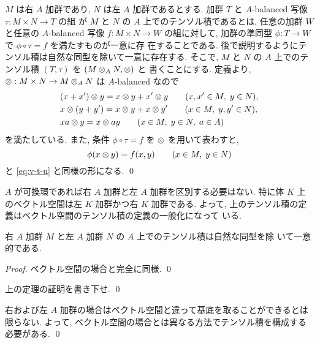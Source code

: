 \documentclass[12pt,twoside]{jarticle}
\begin{document}
\begin{definition}[環上の加群のテンソル積]
  $M$ は右 $A$ 加群であり, $N$ は左 $A$ 加群であるとする.
  加群 $T$ と $A$-balanced 写像 $\tau:M\times N\to T$ の組
  が $M$ と $N$ の $A$ 上でのテンソル積であるとは, 
  任意の加群 $W$ と任意の $A$-balanced 写像 $f:M\times N\to W$ の組に対して, 
  加群の準同型 $\phi: T\to W$ で $\phi\circ\tau = f$ を満たすものが一意に存
  在することである.  
  後で説明するようにテンソル積は自然な同型を除いて一意に存在する.
  そこで, $M$ と $N$ の $A$ 上でのテンソル積 $(T,\tau)$ を $(M\otimes_A N,\otimes)$ と
  書くことにする.  定義より, $\otimes:M\times N\to M\otimes_A N$ は $A$-balanced なので
  \begin{align*}
  &
  (x+x')\otimes y = x\otimes y + x'\otimes y \qquad (x,x'\in M,\;y\in N),
  \\ &
  x\otimes (y+y') = x\otimes y + x\otimes y' \qquad (x\in M,\;y,y'\in N),
  \\ &
  xa\otimes y = x\otimes ay \qquad (x\in M,\; y\in N,\; a\in A)
  \end{align*}
  を満たしている. また, 条件 $\phi\circ\tau = f$ を $\otimes$ を用いて表わすと,
  \begin{equation*}
    \phi(x\otimes y) = f(x,y) \qquad (x\in M,\; y\in N)
  \end{equation*}
  と \eqref{eq:v-t-u} と同様の形になる. \qed 
\end{definition}

$A$ が可換環であれば右 $A$ 加群と左 $A$ 加群を区別する必要はない.
特に体 $K$ 上のベクトル空間は左 $K$ 加群かつ右 $K$ 加群である.
よって, 上のテンソル積の定義はベクトル空間のテンソル積の定義の一般化になって
いる.

\begin{theorem}[テンソル積の一意性]
  右 $A$ 加群 $M$ と左 $A$ 加群 $N$ の $A$ 上でのテンソル積は自然な同型を除
  いて一意的である. 
\end{theorem}

\begin{proof}
  ベクトル空間の場合と完全に同様. \qed
\end{proof}

\begin{question}
  上の定理の証明を書き下せ. \qed
\end{question}

\begin{rem}
  右および左 $A$ 加群の場合はベクトル空間と違って基底を取ることができるとは
  限らない.  よって, ベクトル空間の場合とは異なる方法でテンソル積を構成する
  必要がある. \qed
\end{rem}
\end{document}
